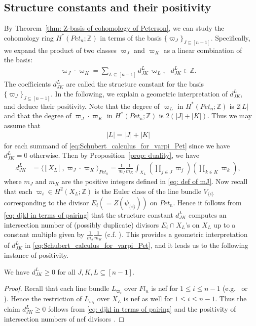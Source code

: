 \subsection{Structure constants and their positivity}\label{subsec: positivity}
By Theorem~\ref{thm: Z-basis of cohomology of Peterson}, we can study the cohomology ring $H^*(Pet_{n};{\mathbb Z})$ in terms of the basis $\{\varpi_J\}_{J\subseteq[n-1]}$. Specifically, we expand the product of two classes $\varpi_J$ and $\varpi_K$ as a linear combination of the basis:
\begin{align} \label{eq:Schubert_calculus_for_varpi_Pet} 
\varpi_J \cdot \varpi_K =\sum_{L \subseteq [n-1]} d_{JK}^L \, \varpi_L, \ \ \ d_{JK}^L \in {\mathbb Z}.
\end{align}
The coefficients $d_{JK}^L$ are called the structure constant for the basis $\{\varpi_J\}_{J\subseteq[n-1]}$. In the following, we explain a geometric interpretation of $d_{JK}^L$, and deduce  their positivity. Note that the degree of $\varpi_L$ in $H^*(Pet_{n};{\mathbb Z})$ is $2|L|$ and that the degree of $\varpi_J \cdot \varpi_K$ in $H^*(Pet_{n};{\mathbb Z})$ is $2(|J|+|K|)$. Thus we may assume that 
\begin{align} \label{eq: degree of piL}
|L|=|J|+|K|
\end{align}
for each summand of \eqref{eq:Schubert_calculus_for_varpi_Pet} since we have $d_{JK}^L =0$ otherwise. Then by Proposition~\ref{prop: duality}, we have
\begin{align}\label{eq: djkl in terms of pairing}
d_{JK}^L 
&= \langle [X_{L}] , \varpi_{J} \cdot \varpi_{K} \rangle_{Pet_{n}} 
= \frac{1}{m_J}
\frac{1}{m_K}\int_{X_L} \left(\prod_{j\in J}\varpi_j\right)\left(\prod_{k\in K}\varpi_k\right) , 
\end{align}
where $m_J$ and $m_K$ are the positive integers defined in \eqref{eq: def of mJ}. Now recall that each $\varpi_i\in H^2(X_L;{\mathbb Z})$ is the Euler class of the line bundle $V_{\{i\}}$ corresponding to the divisor $E_i(=Z(\psi_{\{i\}}))$ on $Pet_{n}$. Hence it follows from \eqref{eq: djkl in terms of pairing} that the structure constant $d_{JK}^L$ computes an intersection number of (possibly duplicate) divisors $E_i\cap X_L$'s on $X_L$ up to a constant multiple given by $\frac{1}{m_J}\frac{1}{m_K}$ (c.f. \cite[Sect.\ 1.1.C]{Lazarsfeld}). This provides a geometric interpretation of $d_{JK}^L$ in \eqref{eq:Schubert_calculus_for_varpi_Pet}, and it leads us to the following instance of positivity.

\begin{prop}\label{prop: positivity}
We have $d_{JK}^L \ge0$ for all $J,K,L\subseteq [n-1]$.
\end{prop}

\begin{proof}
Recall that each line bundle $L_{\varpi_i}$ over $Fl_n$ is nef for $1\le i\le n-1$ (e.g.\ \cite[proof of Proposition 1.4.1]{Bri} or \cite[Lemma 3.5]{ab-fu-ze2}). Hence the restriction of $L_{\varpi_i}$ over $X_L$ is nef as well for $1\le i\le n-1$. Thus the claim $d_{JK}^L \ge 0$ follows from \eqref{eq: djkl in terms of pairing} and the positivity of intersection numbers of nef divisors \cite[Example 1.4.16]{Lazarsfeld}.
\end{proof}
